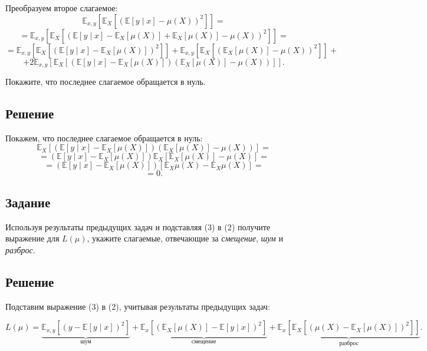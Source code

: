 Преобразуем второе слагаемое:
\[
    \mathbb{E}_{x,y} \left[
        \mathbb{E}_X \left[ \left( \mathbb{E}[y \mid x] - \mu(X) \right)^2 \right] \right] = \]
\[
    = \mathbb{E}_{x,y} \left[
        \mathbb{E}_X \left[ \left( \mathbb{E}[y \mid x] -
            \mathbb{E}_X[\mu(X)] + \mathbb{E}_X[\mu(X)] - \mu(X) \right)^2 \right] \right] =
\]
\[
    = \mathbb{E}_{x,y} \left[
        \mathbb{E}_X \left[ \left( \mathbb{E}[y \mid x] - \mathbb{E}_X[\mu(X)] \right)^2 \right] \right]
    + \mathbb{E}_{x,y} \left[
        \mathbb{E}_X \left[ \left( \mathbb{E}_X[\mu(X)] - \mu(X) \right)^2 \right] \right] +
    \tag{3}\]
\[
    + 2 \mathbb{E}_{x,y} \left[
        \mathbb{E}_X \left[ \left( \mathbb{E}[y \mid x] - \mathbb{E}_X[\mu(X)] \right)
            \left( \mathbb{E}_X[\mu(X)] - \mu(X) \right) \right] \right].
\]

Покажите, что последнее слагаемое обращается в нуль.

\subsection*{Решение}

Покажем, что последнее слагаемое обращается в нуль:
\[
    \mathbb{E}_X \left[ \left( \mathbb{E}[y \mid x] - \mathbb{E}_X \left[ \mu(X) \right] \right)
        \left( \mathbb{E}_X \left[ \mu(X) \right] - \mu(X) \right) \right] =
\]
\[
    = \left( \mathbb{E}[y \mid x] - \mathbb{E}_X \left[ \mu(X) \right] \right)
    \mathbb{E}_X \left[ \mathbb{E}_X \left[ \mu(X) \right] - \mu(X) \right] =
\]
\[
    = \left( \mathbb{E}[y \mid x] - \mathbb{E}_X \left[ \mu(X) \right] \right)
    \left[ \mathbb{E}_X \mu(X) - \mathbb{E}_X \mu(X) \right] =
\]
\[
    = 0.
\]

\subsection*{Задание}

Используя результаты предыдущих задач и подставляя (3) в (2) получите выражение для $L(\mu)$, укажите слагаемые, отвечающие за \emph{смещение}, \emph{шум} и \emph{разброс}.

\newpage

\subsection*{Решение}

Подставим выражение (3) в (2), учитывая результаты предыдущих задач:

\[
    L(\mu) = \underbrace{\mathbb{E}_{x, y} \left[ \left( y - \mathbb{E}[y \mid x] \right)^2 \right]}_{\text{шум}}
    + \underbrace{\mathbb{E}_x \left[ \left( \mathbb{E}_X [\mu(X)] - \mathbb{E}[y \mid x] \right)^2 \right]}_{\text{смещение}}
    + \underbrace{\mathbb{E}_x \left[ \mathbb{E}_X \left[ \left( \mu(X) - \mathbb{E}_X[\mu(X)] \right)^2 \right] \right]}_{\text{разброс}}.
\]

